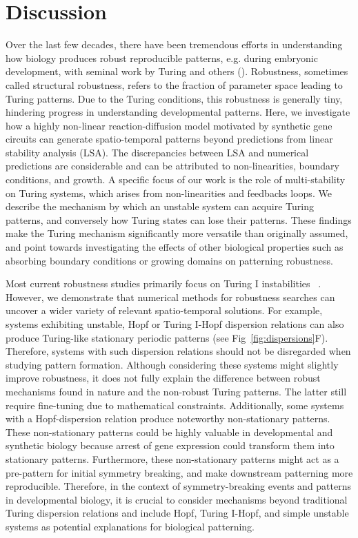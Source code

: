\section*{Discussion}

Over the last few decades, there have been tremendous efforts in understanding how biology produces robust reproducible patterns, e.g. during embryonic development, with seminal work by Turing and others (\cite{Turing1952,Gierer1972, maini2012turing}). Robustness, sometimes called structural robustness, refers to the fraction of parameter space leading to Turing patterns. Due to the Turing conditions, this robustness is generally tiny, hindering progress in understanding developmental patterns. Here, we investigate how a highly non-linear reaction-diffusion model motivated by synthetic gene circuits can generate spatio-temporal patterns beyond predictions from linear stability analysis (LSA). The discrepancies between LSA and numerical predictions are considerable and can be attributed to non-linearities, boundary conditions, and growth. A specific focus of our work is the role of multi-stability on Turing systems, which arises from non-linearities and feedbacks loops. We describe the mechanism by which an unstable system can acquire Turing patterns, and conversely how Turing states can lose their patterns. These findings make the Turing mechanism significantly more versatile than originally assumed, and point towards investigating the effects of other biological properties such as absorbing boundary conditions or growing domains on patterning robustness. 

Most current robustness studies primarily focus on Turing I instabilities ~\parencite{Scholes2019, Zheng2016, Marcon}.
However, we demonstrate that numerical methods for robustness searches can uncover a wider variety of relevant spatio-temporal solutions.
For example, systems exhibiting unstable, Hopf or Turing I-Hopf dispersion relations can also produce Turing-like stationary periodic patterns (see Fig~\ref{fig:dispersions}F). Therefore, systems with such dispersion relations should not be disregarded when studying pattern formation.
Although considering these systems might slightly improve robustness, it does not fully explain the difference between robust mechanisms found in nature and the non-robust Turing patterns. The latter still require fine-tuning due to mathematical constraints.
Additionally, some systems with a Hopf-dispersion relation produce noteworthy non-stationary patterns.
These non-stationary patterns could be highly valuable in developmental and synthetic biology because arrest of gene expression could transform them into stationary patterns.
Furthermore, these non-stationary patterns might act as a pre-pattern for initial symmetry breaking, and make downstream patterning more reproducible. 
Therefore, in the context of symmetry-breaking events and patterns in developmental biology, it is crucial to consider mechanisms beyond traditional Turing dispersion relations and include Hopf, Turing I-Hopf, and simple unstable systems as potential explanations for biological patterning.


